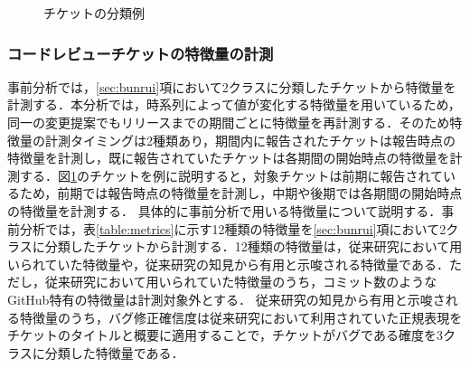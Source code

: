 \documentclass[submit]{ipsj}
\begin{document}
\begin{figure}[h]
\begin{center}
\caption{チケットの分類例}
\label{fig:labeling}
\end{center}
\end{figure}


\subsubsection{コードレビューチケットの特徴量の計測}\label{sec:metrics}
事前分析では，\ref{sec:bunrui}項において2クラスに分類したチケットから特徴量を計測する．本分析では，時系列によって値が変化する特徴量を用いているため，同一の変更提案でもリリースまでの期間ごとに特徴量を再計測する．そのため特徴量の計測タイミングは2種類あり，期間内に報告されたチケットは報告時点の特徴量を計測し，既に報告されていたチケットは各期間の開始時点の特徴量を計測する．図\ref{fig:labeling}のチケットを例に説明すると，対象チケットは前期に報告されているため，前期では報告時点の特徴量を計測し，中期や後期では各期間の開始時点の特徴量を計測する．
具体的に事前分析で用いる特徴量について説明する．事前分析では，表\ref{table:metrics}に示す12種類の特徴量を\ref{sec:bunrui}項において2クラスに分類したチケットから計測する．12種類の特徴量は，従来研究\cite{prioritizer}において用いられていた特徴量や，従来研究\cite{release_merge}\cite{review1}の知見から有用と示唆される特徴量である．ただし，従来研究\cite{prioritizer}において用いられていた特徴量のうち，コミット数のようなGitHub特有の特徴量は計測対象外とする．
従来研究\cite{release_merge}\cite{review1}の知見から有用と示唆される特徴量のうち，バグ修正確信度は従来研究\cite{bug}において利用されていた正規表現をチケットのタイトルと概要に適用することで，チケットがバグである確度を3クラスに分類した特徴量である．
\end{document}
